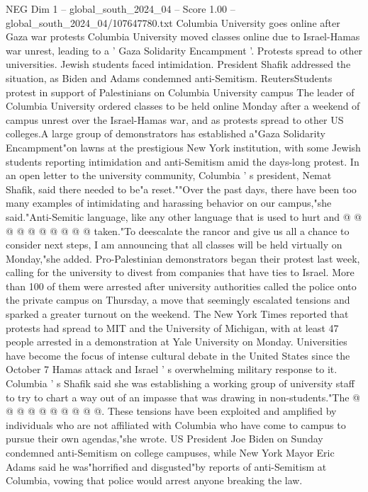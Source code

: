 \begin{textsample}{NEG Dim 1 – global\_south\_2024\_04 – Score 1.00 – global\_south\_2024\_04/107647780.txt}  \label{ex:f1_neg_300}
Columbia University goes online after Gaza war protests Columbia University moved classes online due to Israel-Hamas war unrest, leading to a ' Gaza Solidarity Encampment '.
Protests spread to other universities.
Jewish students faced intimidation.
President Shafik addressed the situation, as Biden and Adams condemned anti-Semitism.
ReutersStudents protest in support of Palestinians on Columbia University campus The leader of Columbia University ordered classes to be held online Monday after a weekend of campus unrest over the Israel-Hamas war, and as protests spread to other US colleges.A large group of demonstrators has established a"Gaza Solidarity Encampment"on lawns at the prestigious New York institution, with some Jewish students reporting intimidation and anti-Semitism amid the days-long protest.
In an open letter to the university community, Columbia ' s president, Nemat Shafik, said there needed to be"a reset.""Over the past days, there have been too many examples of intimidating and harassing behavior on our campus,"she said."Anti-Semitic language, like any other language that is used to hurt and @ @ @ @ @ @ @ @ @ @ taken."To deescalate the rancor and give us all a chance to consider next steps, I am announcing that all classes will be held virtually on Monday,"she added.
Pro-Palestinian demonstrators began their protest last week, calling for the university to divest from companies that have ties to Israel.
More than 100 of them were arrested after university authorities called the police onto the private campus on Thursday, a move that seemingly escalated tensions and sparked a greater turnout on the weekend.
The New York Times reported that protests had spread to MIT and the University of Michigan, with at least 47 people arrested in a demonstration at Yale University on Monday.
Universities have become the focus of intense cultural debate in the United States since the October 7 Hamas attack and Israel ' s overwhelming military response to it.
Columbia ' s Shafik said she was establishing a working group of university staff to try to chart a way out of an impasse that was drawing in non-students."The @ @ @ @ @ @ @ @ @ @.
These tensions have been exploited and amplified by individuals who are not affiliated with Columbia who have come to campus to pursue their own agendas,"she wrote.
US President Joe Biden on Sunday condemned anti-Semitism on college campuses, while New York Mayor Eric Adams said he was"horrified and disgusted"by reports of anti-Semitism at Columbia, vowing that police would arrest anyone breaking the law.

\end{textsample}
